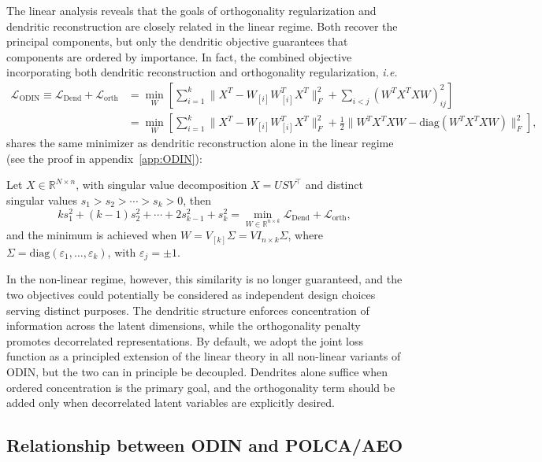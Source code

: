\documentclass[twoside,11pt]{article}
\begin{document}
The linear analysis reveals that the goals of orthogonality regularization and dendritic reconstruction are closely related in the linear regime. Both recover the principal components, but only the dendritic objective guarantees that components are ordered by importance. In fact, the combined objective incorporating both dendritic reconstruction and orthogonality regularization, \emph{i.e.} 
\begin{align*}
    \mathcal{L}_{\text{ODIN}} \equiv \mathcal{L}_{\text{Dend}}+ \mathcal{L}_{\text{orth}}&=  \min_W \left[ \sum_{i=1}^k \|X^T-W_{[i]}W_{[i]}^TX^T\|_F^2+ \sum_{i<j}(W^TX^TXW)_{ij}^2\right]\\&=\min_W \left[ \sum_{i=1}^k \|X^T-W_{[i]}W_{[i]}^TX^T\|_F^2+ \frac{1}{2}\|W^TX^TXW-\text{diag}(W^TX^TXW)\|_F^2\right],
\end{align*}
shares the same minimizer as dendritic reconstruction alone in the linear regime (see the proof in appendix~\ref{app:ODIN}):
\begin{theorem}
    Let $X \in \mathbb{R}^{N \times n}$, with singular value decomposition $X=USV^\top$ and distinct singular values $s_1>s_2>\cdots>s_k>0$, then 
    \[ k s_1^2 + (k-1)s_2^2 + \cdots + 2 s_{k-1}^2 + s_k^2 = \min_{W \in \mathbb{R}^{n \times k}}  \mathcal{L}_{\text{Dend}}+ \mathcal{L}_{\text{orth}}, \]
    and the minimum is achieved when $W=V_{[k]}\Sigma=VI_{n\times k}\Sigma$, where $\Sigma = \mathrm{diag}(\varepsilon_1, \dots, \varepsilon_k)$, with $\varepsilon_j = \pm 1$.
\label{thm:odin_loss}

\end{theorem}

In the non-linear regime, however, this similarity is no longer guaranteed, and the two objectives could potentially be considered as independent design choices serving distinct purposes. The dendritic structure enforces concentration of information across the latent dimensions, while the orthogonality penalty promotes decorrelated representations. By default, we adopt the joint loss function as a principled extension of the linear theory in all non-linear variants of ODIN, but the two can in principle be decoupled. Dendrites alone suffice when ordered concentration is the primary goal, and the orthogonality term should be added only when decorrelated latent variables are explicitly desired.

\subsection{Relationship between ODIN and POLCA/AEO}
\end{document}
